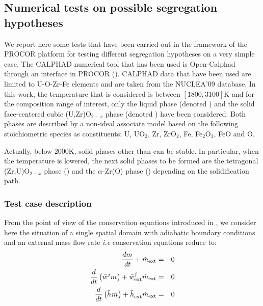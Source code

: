 \subsection{Numerical tests on possible segregation hypotheses} \label{sect:num}

We report here some tests that have been carried out in the framework of the PROCOR platform for testing different segregation hypotheses on a very simple case. The CALPHAD numerical tool that has been used is Open-Calphad through an interface in PROCOR (\cite{Sundman2016}). CALPHAD data that have been used are limited to U-O-Zr-Fe elements and are taken from the NUCLEA'09 database. In this work, the temperature that is considered is between $[1800, 3100]$K and for the composition range of interest, only the liquid phase (denoted ) and the solid face-centered cubic (U,Zr)O$_{2-x}$ phase (denoted ) have been considered. Both phases are described by a non-ideal associate model based on the following stoichiometric species as constituents: U, UO$_2$, Zr, ZrO$_2$, Fe, Fe$_2$O$_3$, FeO and O.

\begin{remark}{} 
Actually, below 2000K, solid phases other than  can be stable. In particular, when the temperature is lowered, the next solid phases to be formed are the tetragonal (Zr,U)O$_{2-x}$ phase () and the $\alpha$-Zr(O) phase () depending on the solidification path.
\end{remark}

\subsubsection{Test case description}

From the point of view of the conservation equations introduced in , we consider here the situation of a single spatial domain with adiabatic boundary conditions and an external mass flow rate \textit{i.e} conservation equations reduce to:
\begin{eqnarray}
 \frac{d\mass{}}{dt} + \dot{m}_{\textrm{ext}} &=& 0 \label{eq:bulk_m1}\\
 \frac{d}{dt} \left( \avMassFraction[j]{} \mass{} \right) + \avMassFraction[j]{\textrm{ext}} \dot{m}_{\textrm{ext}} &=& 0 \label{eq:bulk_w1} \\
 \frac{d}{dt} \left( \avMassEnthalpy{} \mass{} \right) + \avMassEnthalpy{\textrm{ext}} \dot{m}_{\textrm{ext}} &=& 0  \label{eq:bulk_h1}
\end{eqnarray}

